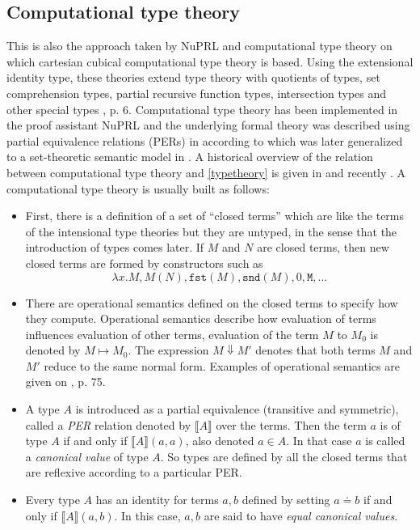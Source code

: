 \documentclass[12pt,a4paper,twoside,xetex]{book} %
\newcommand{\keyword}[1]{\emph{#1}\index{#1}}
\begin{document}
\subsection{Computational type theory}

This is also the approach taken by NuPRL and computational type theory on which 
cartesian cubical computational type theory is based. Using the extensional 
identity type, these theories extend type theory with quotients of types, set 
comprehension types, partial recursive function types, intersection types and 
other special types \cite{Constable2011}, p. 6.  Computational type theory has 
been implemented in the proof assistant NuPRL and the underlying formal theory 
was described using partial equivalence relations (PERs) in \cite{Allen1987} 
according to \cite{Angiuli2018} which was later generalized to a set-theoretic semantic model in 
\cite{Harper1991}. A historical overview of the relation between computational type theory and \cref{typetheory} is given in \cite{Constable2003} and recently 
\cite{Constable2015July}. A computational type theory is usually built as 
follows:

\begin{itemize}
 \item First, there is a definition of a set of ``closed terms'' which are like 
the terms of the intensional type theories but they are untyped, in the sense 
that the introduction of types comes later. If $M$ and $N$ are closed terms, 
then new closed terms are formed by constructors such as $$\lambda x . M, M (N), 
\texttt{fst}(M), \texttt{snd}(M), 0, \texttt{M}, ...$$ 
 
 \item There are operational semantics defined on the closed terms to specify 
how they compute. Operational semantics describe how evaluation of terms 
influences evaluation of other terms, evaluation of the term $M$ to $M_0$ is 
denoted by $M \mapsto M_0$. The expression $M \Downarrow M'$ denotes that both 
terms $M$ and $M'$ reduce to the same normal form. Examples of operational 
semantics are given on \cite{Harper1991}, p. 75.
 
 \item A type $A$ is introduced as a partial equivalence (transitive and 
symmetric), called a \keyword{PER} relation denoted by $\llbracket A \rrbracket$ 
over the terms. Then the term $a$ is of type $A$ if and only if $\llbracket A 
\rrbracket (a,a)$, also denoted $a \in A$. In that case $a$ is called a 
\keyword{canonical value} of type $A$. So types are defined by all the closed 
terms that are reflexive according to a particular PER. 
 
 \item Every type $A$ has an identity for terms $a,b$ defined by 
setting $a \doteq b$ if and only if $\llbracket A \rrbracket (a,b)$. In this 
case, $a,b$ are said to have \keyword{equal canonical values}.

\end{itemize}
\end{document}
